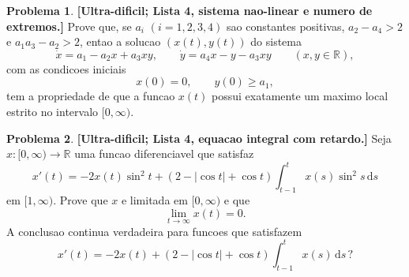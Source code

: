 \documentclass[10pt,a4paper]{amsart}
\newcommand{\R}{\mathbb{R}}
\renewcommand{\d}{\mathrm{d}}
\theoremstyle{definition}
\newtheorem{problema}{Problema}
\begin{document}
\begin{problema}
\textbf{[Ultra-dificil; Lista 4, sistema nao-linear e numero de extremos.]}
Prove que, se $a_i$ $(i=1,2,3,4)$ sao constantes positivas,
$a_2-a_4>2$ e $a_1a_3-a_2>2$, entao a solucao $(x(t),y(t))$ do sistema
\[
    \dot{x}=a_1-a_2x+a_3xy,
    \qquad
    \dot{y}=a_4x-y-a_3xy
    \qquad (x,y\in\R),
\]
com as condicoes iniciais
\[
    x(0)=0,\qquad y(0)\ge a_1,
\]
tem a propriedade de que a funcao $x(t)$ possui exatamente um maximo local estrito no
intervalo $[0,\infty)$.
\end{problema}

\begin{problema}
\textbf{[Ultra-dificil; Lista 4, equacao integral com retardo.]}
Seja $x:[0,\infty)\to\R$ uma funcao diferenciavel que satisfaz
\[
    x'(t)
    =
    -2x(t)\sin^2 t
    +
    (2-|\cos t|+\cos t)
    \int_{t-1}^{t}x(s)\sin^2 s\,\d s
\]
em $[1,\infty)$. Prove que $x$ e limitada em $[0,\infty)$ e que
\[
    \lim_{t\to\infty}x(t)=0.
\]
A conclusao continua verdadeira para funcoes que satisfazem
\[
    x'(t)
    =
    -2x(t)
    +
    (2-|\cos t|+\cos t)
    \int_{t-1}^{t}x(s)\,\d s\,?
\]
\end{problema}
\end{document}
